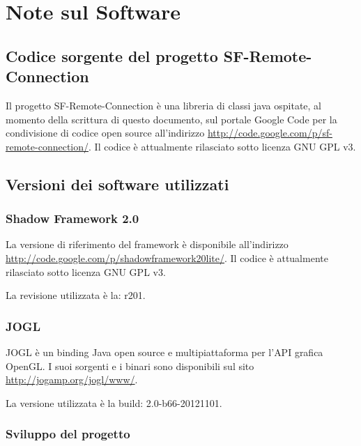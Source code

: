 
\chapter{Note sul Software}
\label{a:notesoftware}

\section{Codice sorgente del progetto SF-Remote-Connection}
\label{sec:sfrcsource}
Il progetto SF-Remote-Connection \`e una libreria di classi java ospitate, al momento della scrittura di questo documento, sul portale Google Code per la condivisione di codice open source all'indirizzo \url{http://code.google.com/p/sf-remote-connection/}.
Il codice \`e attualmente rilasciato sotto licenza GNU GPL v3.



\section{Versioni dei software utilizzati}
\label{sec:versionisw}

\subsection{Shadow Framework 2.0}
\label{sub:sfsource}
La versione di riferimento del framework \`e disponibile all'indirizzo \url{http://code.google.com/p/shadowframework20lite/}. Il codice \`e attualmente rilasciato sotto licenza GNU GPL v3.

La revisione utilizzata \`e la: r201.

\subsection{JOGL}
\label{sub:jogl}
JOGL \`e un binding Java open source e multipiattaforma per l'\ac{API} grafica OpenGL.
I suoi sorgenti e i binari sono disponibili sul sito \url{http://jogamp.org/jogl/www/}.

La versione utilizzata \`e la build: 2.0-b66-20121101.

\subsection{Sviluppo del progetto}
\label{sub:sviluppo}
